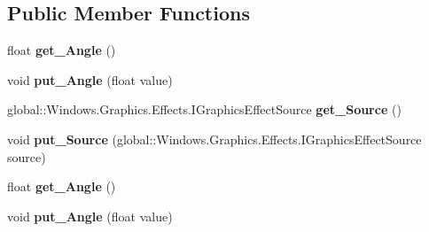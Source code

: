 \subsection*{Public Member Functions}
\begin{DoxyCompactItemize}
\item 
\mbox{\label{interface_microsoft_1_1_graphics_1_1_canvas_1_1_effects_1_1_i_hue_rotation_effect_a7e1cc248274b2ef58fdb4796ecf993a2}} 
float {\bfseries get\+\_\+\+Angle} ()
\item 
\mbox{\label{interface_microsoft_1_1_graphics_1_1_canvas_1_1_effects_1_1_i_hue_rotation_effect_ae26bc54153b6d6e0b9c9981d3097859a}} 
void {\bfseries put\+\_\+\+Angle} (float value)
\item 
\mbox{\label{interface_microsoft_1_1_graphics_1_1_canvas_1_1_effects_1_1_i_hue_rotation_effect_a985c537972d6f1c44f2004ddbc228e45}} 
global\+::\+Windows.\+Graphics.\+Effects.\+I\+Graphics\+Effect\+Source {\bfseries get\+\_\+\+Source} ()
\item 
\mbox{\label{interface_microsoft_1_1_graphics_1_1_canvas_1_1_effects_1_1_i_hue_rotation_effect_add1d03b98525daf7cf8bd4e598fbd195}} 
void {\bfseries put\+\_\+\+Source} (global\+::\+Windows.\+Graphics.\+Effects.\+I\+Graphics\+Effect\+Source source)
\item 
\mbox{\label{interface_microsoft_1_1_graphics_1_1_canvas_1_1_effects_1_1_i_hue_rotation_effect_a7e1cc248274b2ef58fdb4796ecf993a2}} 
float {\bfseries get\+\_\+\+Angle} ()
\item 
\mbox{\label{interface_microsoft_1_1_graphics_1_1_canvas_1_1_effects_1_1_i_hue_rotation_effect_ae26bc54153b6d6e0b9c9981d3097859a}} 
void {\bfseries put\+\_\+\+Angle} (float value)
\item 
\mbox{\label{interface_microsoft_1_1_graphics_1_1_canvas_1_1_effects_1_1_i_hue_rotation_effect_a985c537972d6f1c44f2004ddbc228e45}} 

\end{DoxyCompactItemize}
